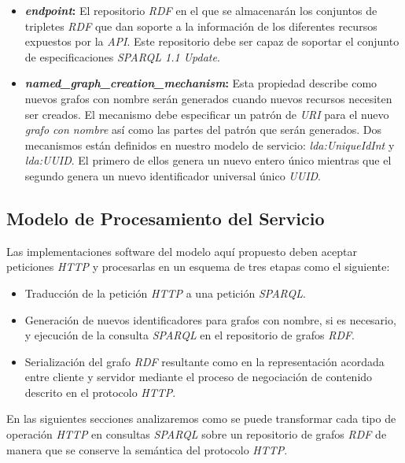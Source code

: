 \begin{itemize}
\item \textbf{\textit{endpoint}:} El repositorio \textit{RDF} en el que se almacenar\'an los conjuntos de tripletes \textit{RDF} que dan soporte a la informaci\'on de los diferentes recursos expuestos por la \textit{API}. Este repositorio debe ser capaz de soportar el conjunto de especificaciones \textit{SPARQL 1.1 Update}.
\item \textbf{\textit{named\_graph\_creation\_mechanism}:} Esta propiedad describe como nuevos grafos con nombre ser\'an generados cuando nuevos recursos necesiten ser creados. El mecanismo debe especificar un patr\'on de \textit{URI} para el nuevo \textit{grafo con nombre} as\'i como las partes del patr\'on que ser\'an generados. Dos mecanismos est\'an definidos en nuestro modelo de servicio: \textit{lda:UniqueIdInt} y \textit{lda:UUID}. El primero de ellos genera un nuevo entero \'unico mientras que el segundo genera un nuevo identificador universal \'unico \textit{UUID}.
\end{itemize}

\subsection{Modelo de Procesamiento del Servicio}

Las implementaciones software del modelo aqu\'i propuesto deben aceptar peticiones \textit{HTTP} y procesarlas en un esquema de tres etapas como el siguiente:\

\begin{itemize}
\item Traducci\'on de la petici\'on \textit{HTTP} a una petici\'on \textit{SPARQL}.
\item Generaci\'on de nuevos identificadores para grafos con nombre, si es necesario, y ejecuci\'on de la consulta \textit{SPARQL} en el repositorio de grafos \textit{RDF}.
\item Serializaci\'on del grafo \textit{RDF} resultante como en la representaci\'on acordada entre cliente y servidor mediante el proceso de negociaci\'on de contenido descrito en el protocolo \textit{HTTP}.
\end{itemize}

En las siguientes secciones analizaremos como se puede transformar cada tipo de operaci\'on \textit{HTTP} en consultas \textit{SPARQL} sobre un repositorio de grafos \textit{RDF} de manera que se conserve la sem\'antica del protocolo \textit{HTTP}.

